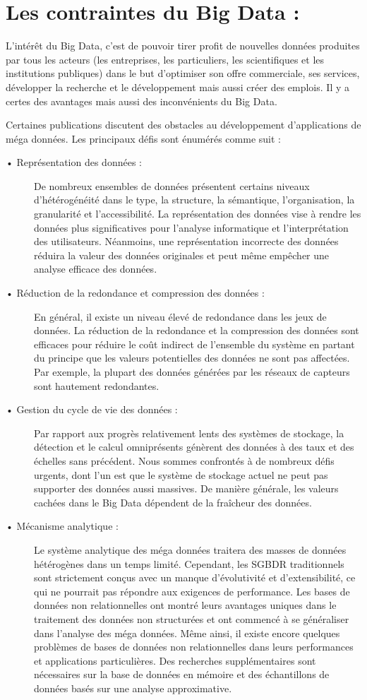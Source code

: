 \section{Les contraintes du Big Data :}

L'intérêt du Big Data, c'est de pouvoir tirer profit de nouvelles données produites par tous les acteurs (les entreprises, les particuliers, les scientifiques et les institutions publiques) dans le but d'optimiser son offre commerciale, ses services, développer la recherche et le développement mais aussi créer des emplois. Il y a certes des avantages mais aussi des inconvénients du Big Data.

Certaines publications discutent des obstacles au développement d'applications de méga données. Les principaux défis sont énumérés comme suit :

\begin{description}
\item[•	Représentation des données : ]
De nombreux ensembles de données présentent certains niveaux d'hétérogénéité dans le type, la structure, la sémantique, l'organisation, la granularité et l'accessibilité. La représentation des données vise à rendre les données plus significatives pour l'analyse informatique et l'interprétation des utilisateurs. Néanmoins, une représentation incorrecte des données réduira la valeur des données originales et peut même empêcher une analyse efficace des données.
\item[•	Réduction de la redondance et compression des données :] En général, il existe un niveau élevé de redondance dans les jeux de données. La réduction de la redondance et la compression des données sont efficaces pour réduire le coût indirect de l'ensemble du système en partant du principe que les valeurs potentielles des données ne sont pas affectées. Par exemple, la plupart des données générées par les réseaux de capteurs sont hautement redondantes.
\item[•	Gestion du cycle de vie des données :] Par rapport aux progrès relativement lents des systèmes de stockage, la détection et le calcul omniprésents génèrent des données à des taux et des échelles sans précédent. Nous sommes confrontés à de nombreux défis urgents, dont l'un est que le système de stockage actuel ne peut pas supporter des données aussi massives. De manière générale, les valeurs cachées dans le Big Data dépendent de la fraîcheur des données.
\item[•	Mécanisme analytique :] Le système analytique des méga données traitera des masses de données hétérogènes dans un temps limité. Cependant, les SGBDR traditionnels sont strictement conçus avec un manque d'évolutivité et d'extensibilité, ce qui ne pourrait pas répondre aux exigences de performance. Les bases de données non relationnelles ont montré leurs avantages uniques dans le traitement des données non structurées et ont commencé à se généraliser dans l'analyse des méga données. Même ainsi, il existe encore quelques problèmes de bases de données non relationnelles dans leurs performances et applications particulières. Des recherches supplémentaires sont nécessaires sur la base de données en mémoire et des échantillons de données basés sur une analyse approximative.

\end{description}
